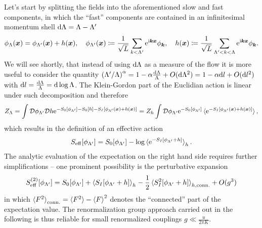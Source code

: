Let's start by splitting the fields into the aforementioned slow and fast components, in which the ``fast'' components are contained in an infinitesimal momentum shell $\mathrm d\Lambda=\Lambda-\Lambda'$
\begin{align}
    \phi_\Lambda({\bm x}) = \phi_{\Lambda'}({\bm x}) + h({\bm x}),
    \quad
    \phi_{\Lambda'}({\bm x})\coloneqq\frac1{\sqrt L}\sum_{k<\Lambda'}\mathrm e^{\mathrm i {\bm k}{\bm x}}\phi_{\bm k},
    \quad
    h({\bm x}) \coloneqq \frac1{\sqrt L}\sum_{\Lambda'<k<\Lambda}\mathrm e^{\mathrm i {\bm k}{\bm x}}\phi_{\bm k}.
\end{align}
We will see shortly, that instead of using $\mathrm d\Lambda$ as a measure of the flow it is more useful to consider the quantity $\left( \Lambda'/\Lambda \right)^\alpha=1-\alpha\frac{\mathrm d\Lambda}\Lambda + O(\mathrm d\Lambda^2) = 1-\alpha\mathrm d l + O(\mathrm d l^2)$ with $\mathrm d l =\frac{\mathrm d\Lambda}\Lambda = \mathrm d\log\Lambda$.
The Klein-Gordon part of the Euclidian action is linear under such decomposition and therefore
\begin{align}
    Z_\Lambda
    = \int\mathcal D\phi_{\Lambda'}\mathcal D h \mathrm e^{-S_0[\phi_{\Lambda'}]-S_0[h]-S_I[\phi_{\Lambda'}({\bm x}) + h({\bm x})]}
    = Z_h\int\mathcal D\phi_{\Lambda'}\mathrm e^{-S_0[\phi_{\Lambda'}]}\braket{\mathrm e^{-S_I[\phi_{\Lambda'}({\bm x}) + h({\bm x})]}},
\end{align}
which results in the definition of an effective action
\begin{align}
    S_{\rm eff}[\phi_{\Lambda'}] = S_0[\phi_{\Lambda'}] - \log\braket{\mathrm e^{-S_I[\phi_{\Lambda'}+h]}}_h.
\end{align}
The analytic evaluation of the expectation on the right hand side requires further simplifications -- one prominent possibility is the perturbative expansion
\begin{align}
    S^{(2)}_{\rm eff}[\phi_{\Lambda'}] = S_0[\phi_{\Lambda'}] + \braket{S_I[\phi_{\Lambda'}+h]}_h - \frac12\braket{S^2_I[\phi_{\Lambda'}+h]}_{h,{\rm conn.}} + O(g^3)
\end{align}
in which $\braket{F^2}_{\rm conn.} = \braket{F^2}-\braket{F}^2$ denotes the ``connected'' part of the expectation value.
The renormalization group approach carried out in the following is thus reliable for small renormalized couplings $g\ll \frac u{2\pi K}$.

